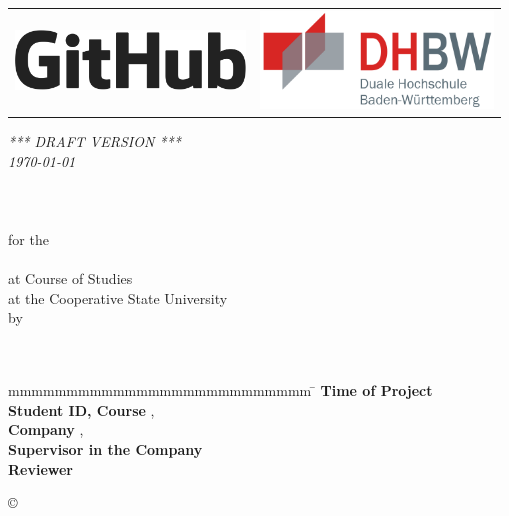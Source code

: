 \begin{titlepage}
	\begin{longtable}{p{} p{}}
		{\includegraphics[height=1.6cm]{images/logo.png}} &
		{\includegraphics[height=2.6cm]{images/dhbw.png}}
	\end{longtable}
	\enlargethispage{20mm}
	\begin{center}
		{\textit{ *** DRAFT VERSION *** \\{\tiny \today \\}}}
		{\vspace*{12mm}}
		{\LARGE\textbf{ \titel }}\\
		\vspace*{4mm}   {\large \untertitel}\\
		\vspace*{12mm}	{\large\textbf{ \arbeit}}\\
		\vspace*{8mm}  	for the\\
		\vspace*{3mm} 	{\textbf{ \abschluss}}\\
		\vspace*{12mm}	at Course of Studies \studiengang\\
		\vspace*{3mm} 	at the Cooperative State University \dhbw\\
		\vspace*{12mm}	by\\
		\vspace*{3mm} 	{\large\textbf{ \autor}}\\
		\vspace*{12mm}	\datumAbgabe\\
	\end{center}
	\vfill
	\begin{spacing}{1.2}
		\begin{tabbing}
			mmmmmmmmmmmmmmmmmmmmmmmmmm     \= \kill
			\textbf{Time of Project}  \>  \zeitraum\\
			\textbf{Student ID, Course}  \>  \matrikelnr, \kurs\\
			\textbf{Company}      \>  \firma, \small{\textit{\firmenort}}\\
			\textbf{Supervisor in the Company}              \>  \betreuer\\
			\textbf{Reviewer}             \>  \gutachter
		\end{tabbing}
	\end{spacing}
	\begin{flushright}
		\copyright{} \jahr
	\end{flushright}
\end{titlepage}
